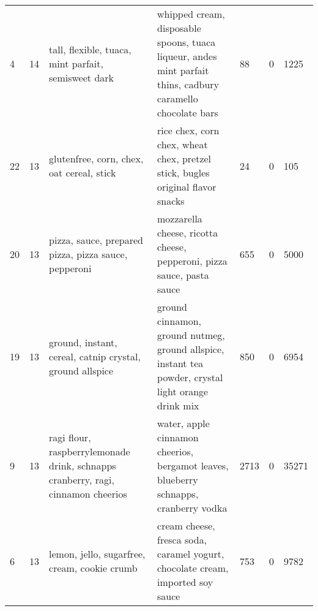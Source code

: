 \begin{tabular}{lllllll}
4 & 14 & tall, flexible, tuaca, mint parfait, semisweet dark & whipped cream, disposable spoons, tuaca liqueur, andes mint parfait thins, cadbury caramello chocolate bars & 88 & 0 & 1225 \\
22 & 13 & glutenfree, corn, chex, oat cereal, stick & rice chex, corn chex, wheat chex, pretzel stick, bugles original flavor snacks & 24 & 0 & 105 \\
20 & 13 & pizza, sauce, prepared pizza, pizza sauce, pepperoni & mozzarella cheese, ricotta cheese, pepperoni, pizza sauce, pasta sauce & 655 & 0 & 5000 \\
19 & 13 & ground, instant, cereal, catnip crystal, ground allspice & ground cinnamon, ground nutmeg, ground allspice, instant tea powder, crystal light orange drink mix & 850 & 0 & 6954 \\
9 & 13 & ragi flour, raspberrylemonade drink, schnapps cranberry, ragi, cinnamon cheerios & water, apple cinnamon cheerios, bergamot leaves, blueberry schnapps, cranberry vodka & 2713 & 0 & 35271 \\
6 & 13 & lemon, jello, sugarfree, cream, cookie crumb & cream cheese, fresca soda, caramel yogurt, chocolate cream, imported soy sauce & 753 & 0 & 9782 \\
\bottomrule
\end{tabular}
